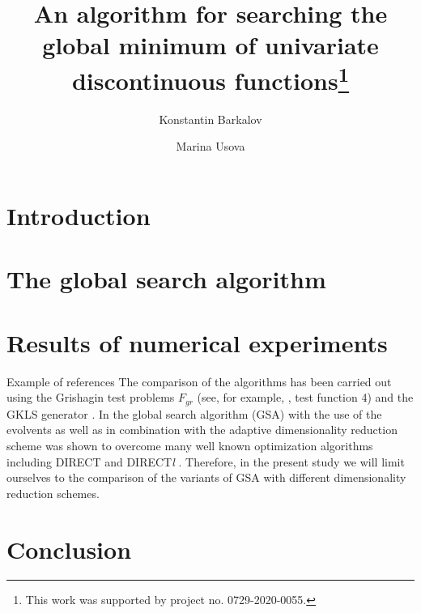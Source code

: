 \documentclass[runningheads]{llncs}
\begin{document}
%
\title{An algorithm for searching the global minimum of univariate discontinuous functions\thanks{This work was supported by project no. 0729-2020-0055.}}
%
%
\author{Konstantin Barkalov %
\and Marina Usova %
}
%
%
%
\maketitle              %
%
\begin{abstract}


\end{abstract}
%
%
%
\section{Introduction}


\section{The global search algorithm}
\label{SectionCore}


\section{Results of numerical experiments}

Example of references 
The comparison of the algorithms has been carried out using the Grishagin test problems $F_{gr}$ (see, for example, \cite{Grishagin1994}, test function 4) and the GKLS generator \cite{Gaviano2003}.
In \cite{Barkalov2015,Grishagin2018} the global search algorithm (GSA) with the use of the evolvents as well as in combination 
with the adaptive dimensionality reduction scheme was shown to overcome many well known optimization 
algorithms including DIRECT \cite{Jones1993} and DIRECT\textit{l} \cite{Gablonsky2001}. Therefore, in the present study we will limit ourselves to the comparison of the  variants of GSA with different dimensionality reduction schemes. 


\section{Conclusion}




%
%
%
 
 
\end{document}
